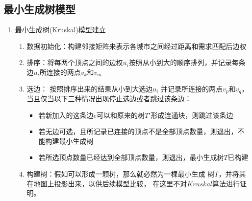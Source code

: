 \documentclass[UTF8,12pt]{ctexart}
\begin{document}
    \subsection{最小生成树模型}\label{ZXSCSMX}
        \begin{enumerate}
            \item 最小生成树(Kruskal)模型建立
                \begin{enumerate}
                    \item 数据初始化：构建邻接矩阵来表示各城市之间经过距离和需求匹配后边权
                    \item 排序：将每两个顶点之间的边权$u_i$按照从小到大的顺序排列，并记录每条边$u_i$所连接的两点$v_k$和$v_m$
                    \item 选边：
                        按照排序出来的结果从小到大选边$u_i$
                        并记录所连接的两点$v_p$和$v_q$，
                        当且仅当以下三种情况出现停止选边或者跳过该条边：
                        \begin{itemize}
                            \item 若新加入的这条边$e$可以和原来的树$T'$形成连通块，则跳过该条边
                            \item 若无边可选，且所记录已连接的顶点不是全部顶点数量，则退出，不能构建最小生成树
                            \item 若所选顶点数量已经达到全部顶点数量，则退出，最小生成树$T$已构建
                        \end{itemize}
                    \item 构建树：假如可以形成一颗树，那么就必然为一棵最小生成
                        树$T$，并将其在地图上投影出来，以供后续模型比较，
                        在这里不对$Kruskal$算法进行证明。
                \end{enumerate}


\end{enumerate}
\end{document}
